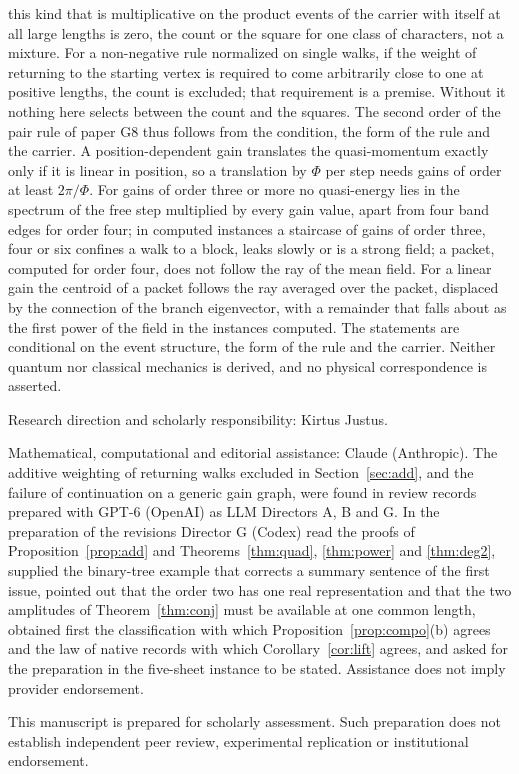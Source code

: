 \documentclass[11pt,a4paper]{article}
\begin{document}
\begin{titlepage}
this kind that is multiplicative on the product events of the carrier with itself at all large lengths is zero, the count or the square for one class of characters, not a mixture. For a non-negative rule normalized on single walks, if the weight of returning to the starting vertex is required to come arbitrarily close to one at positive lengths, the count is excluded; that requirement is a premise. Without it nothing here selects between the count and the squares. The second order of the pair rule of paper G8 thus follows from the condition, the form of the rule and the carrier. A position-dependent gain translates the quasi-momentum exactly only if it is linear in position, so a translation by $\Phi$ per step needs gains of order at least $2\pi/\Phi$. For gains of order three or more no quasi-energy lies in the spectrum of the free step multiplied by every gain value, apart from four band edges for order four; in computed instances a staircase of gains of order three, four or six confines a walk to a block, leaks slowly or is a strong field; a packet, computed for order four, does not follow the ray of the mean field. For a linear gain the centroid of a packet follows the ray averaged over the packet, displaced by the connection of the branch eigenvector, with a remainder that falls about as the first power of the field in the instances computed. The statements are conditional on the event structure, the form of the rule and the carrier. Neither quantum nor classical mechanics is derived, and no physical correspondence is asserted.\par
\vfill
{\small Research direction and scholarly responsibility: Kirtus Justus.\par
Mathematical, computational and editorial assistance: Claude (Anthropic).
The additive weighting of returning walks excluded in Section~\ref{sec:add}, and the failure of continuation on a generic gain graph, were found in review records prepared with GPT-6 (OpenAI) as LLM Directors A, B and G. In the preparation of the revisions Director G (Codex) read the proofs of Proposition~\ref{prop:add} and Theorems~\ref{thm:quad}, \ref{thm:power} and \ref{thm:deg2}, supplied the binary-tree example that corrects a summary sentence of the first issue, pointed out that the order two has one real representation and that the two amplitudes of Theorem~\ref{thm:conj} must be available at one common length, obtained first the classification with which Proposition~\ref{prop:compo}(b) agrees and the law of native records with which Corollary~\ref{cor:lift} agrees, and asked for the preparation in the five-sheet instance to be stated.
Assistance does not imply provider endorsement.\par
This manuscript is prepared for scholarly assessment. Such preparation does not establish independent peer review,
experimental replication or institutional endorsement.\par}
\end{titlepage}
\end{document}
